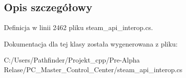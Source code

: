 \subsection{Opis szczegółowy}


Definicja w linii 2462 pliku steam\+\_\+api\+\_\+interop.\+cs.



Dokumentacja dla tej klasy została wygenerowana z pliku\+:\begin{DoxyCompactItemize}
\item 
C\+:/\+Users/\+Pathfinder/\+Projekt\+\_\+cpp/\+Pre-\/\+Alpha Relase/\+P\+C\+\_\+\+Master\+\_\+\+Control\+\_\+\+Center/steam\+\_\+api\+\_\+interop.\+cs\end{DoxyCompactItemize}
